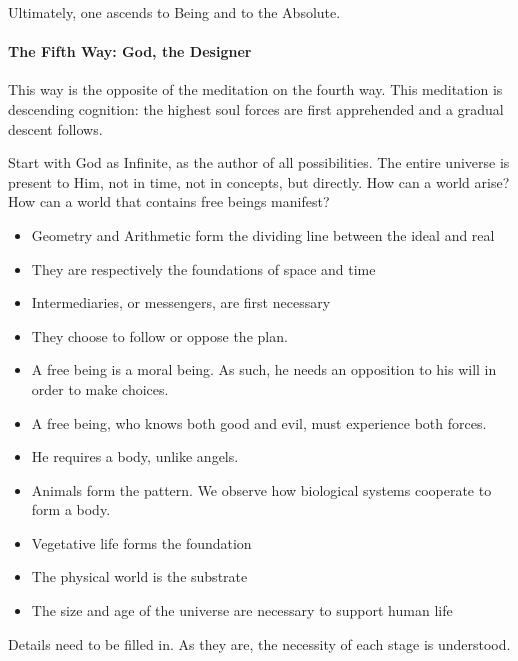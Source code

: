 Ultimately, one ascends to Being and to the Absolute.

\paragraph{The Fifth Way: God, the Designer}

This way is the opposite of the meditation on the fourth way. This meditation is descending cognition: the highest soul forces are first apprehended and a gradual descent follows.

Start with God as Infinite, as the author of all possibilities. The entire universe is present to Him, not in time, not in concepts, but directly. How can a world arise? How can a world that contains free beings manifest?

\begin{itemize}
\item Geometry and Arithmetic form the dividing line between the ideal and real 
\item They are respectively the foundations of space and time 
\item Intermediaries, or messengers, are first necessary 
\item They choose to follow or oppose the plan. 
\item A free being is a moral being. As such, he needs an opposition to his will in order to make choices. 
\item A free being, who knows both good and evil, must experience both forces. 
\item He requires a body, unlike angels. 
\item Animals form the pattern. We observe how biological systems cooperate to form a body. 
\item Vegetative life forms the foundation 
\item The physical world is the substrate 
\item The size and age of the universe are necessary to support human life 
\end{itemize}
Details need to be filled in. As they are, the necessity of each stage is understood.



